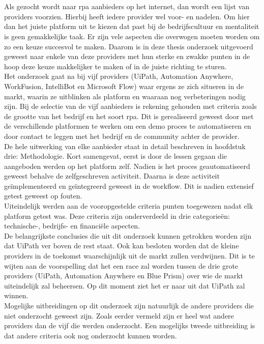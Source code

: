 \chapter*{}
Als gezocht wordt naar \acrshort{rpa} aanbieders op het internet, dan wordt een lijst van providers voorzien. Hierbij heeft iedere provider wel voor- en nadelen. Om hier dan het juiste platform uit te kiezen dat past bij de bedrijfscultuur en mentaliteit is geen gemakkelijke taak. Er zijn vele aspecten die overwogen moeten worden om zo een keuze succesvol te maken. Daarom is in deze thesis onderzoek uitgevoerd geweest naar enkele van deze providers met hun sterke en zwakke punten in de hoop deze keuze makkelijker te maken of in de juiste richting te sturen.\\
Het onderzoek gaat na bij vijf providers (UiPath, Automation Anywhere, WorkFusion, IntelliBot en Microsoft Flow) waar ergens ze zich situeren in de markt, waarin ze uitblinken als platform en waaraan nog verbeteringen nodig zijn. Bij de selectie van de vijf aanbieders is rekening gehouden met criteria zoals de grootte van het bedrijf en het soort \acrshort{rpa}. Dit is gerealiseerd geweest door met de verschillende platformen te werken om een demo proces te automatiseren en door contact te leggen met het bedrijf en de community achter de provider.\\
De hele uitwerking van elke aanbieder staat in detail beschreven in hoofdstuk drie: Methodologie. Kort samengevat, eerst is door de lessen gegaan die aangeboden werden op het platform zelf. Nadien is het proces geautomatiseerd geweest behalve de zelfgeschreven activiteit. Daarna is deze activiteit geïmplementeerd en geïntegreerd geweest in de workflow. Dit is nadien extensief getest geweest op fouten.\\
Uiteindelijk werden aan de vooropgestelde criteria punten toegewezen nadat elk platform getest was. Deze criteria zijn onderverdeeld in drie categorieën: technische-, bedrijfs- en financiële aspecten.\\
De belangrijkste conclusies die uit dit onderzoek kunnen getrokken worden zijn dat UiPath ver boven de rest staat. Ook kan besloten worden dat de kleine providers in de toekomst waarschijnlijk uit de markt zullen verdwijnen. Dit is te wijten aan de voorspelling dat het een race zal worden tussen de drie grote providers (UiPath, Automation Anywhere en Blue Prism) over wie de markt uiteindelijk zal beheersen. Op dit moment ziet het er naar uit dat UiPath zal winnen.\\
Mogelijke uitbreidingen op dit onderzoek zijn natuurlijk de andere providers die niet onderzocht geweest zijn. Zoals eerder vermeld zijn er heel wat andere providers dan de vijf die werden onderzocht. Een mogelijks tweede uitbreiding is dat andere criteria ook nog onderzocht kunnen worden.